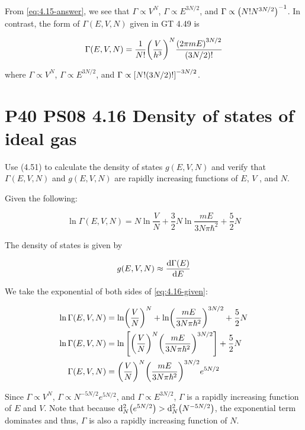 \documentclass[9pt,a4paper,twocolumn]{article}
\begin{document}
From \eqref{eq:4.15-answer}, we see that $\Gamma \propto V^N$, $\Gamma \propto E^{3N/2}$, and $\Gamma \propto \qty(N!N^{3N/2})^{-1}$. In contrast, the form of $\Gamma(E,V,N)$ given in GT 4.49 is

\begin{equation}
	\Gamma(E,V,N) = \frac{1}{N!}\qty(\frac{V}{h^3})^N \frac{\qty(2\pi mE)^{3N/2}}{\qty(3N/2)!} \label{eq:4.15-semiclassical}
\end{equation}

where $\Gamma \propto V^N$, $\Gamma \propto E^{3N/2}$, and $\Gamma \propto \qty[N!\qty(3N/2)!]^{-3N/2}$.

\section{P40 PS08 4.16 Density of states of ideal gas}
Use (4.51) to calculate the density of states $g(E, V,N)$ and verify that $\Gamma(E, V,N)$ and $g(E, V,N)$ are rapidly increasing functions of $E$, $V$ , and $N$.

Given the following:

\begin{equation}
	\ln \Gamma(E,V,N) = N \ln\frac{V}{N} + \frac{3}{2}N\ln\frac{mE}{3N\pi\hbar^2} + \frac{5}{2}N \label{eq:4.16-given}
\end{equation}

The density of states is given by

\begin{equation}
	g(E,V,N) \approx \dv{\Gamma(E)}{E} \label{eq:4.16-density-states}
\end{equation}

We take the exponential of both sides of \eqref{eq:4.16-given}:

\begin{align}
	\ln\Gamma(E,V,N) &= \ln(\frac{V}{N})^N + \ln(\frac{mE}{3N\pi\hbar^2})^{3N/2} + \frac{5}{2}N \nonumber \\
	\ln\Gamma(E,V,N) &= \ln\qty[\qty(\frac{V}{N})^N \qty(\frac{mE}{3N\pi\hbar^2})^{3N/2}] + \frac{5}{2}N \nonumber \\
	\Gamma(E,V,N) &= \qty(\frac{V}{N})^N \qty(\frac{mE}{3N\pi\hbar^2})^{3N/2} e^{5N/2} \label{eq:4.16-gamma}
\end{align}

Since $\Gamma \propto V^N$, $\Gamma \propto N^{-5N/2}e^{5N/2}$, and $\Gamma \propto E^{3N/2}$, $\Gamma$ is a rapidly increasing function of $E$ and $V$. Note that because $\dd[2]_N\qty(e^{5N/2}) > \dd[2]_N\qty(N^{-5N/2})$, the exponential term dominates and thus, $\Gamma$ is also a rapidly increasing function of $N$.
\end{document}
